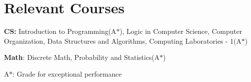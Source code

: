 \section*{\sc Relevant Courses}
\vspace{-2mm}
\hrulefill
\vspace{.2cm}

\textbf{CS:} Introduction to Programming(A$*$), Logic in Computer
Science, Computer Organization, Data Structures and Algorithms, Computing
Laboratories - 1(A$*$)


\textbf{Math}: Discrete Math, Probability and Statistics(A$*$)


{\footnotesize
    {A$*$: Grade for exceptional performance}
}

